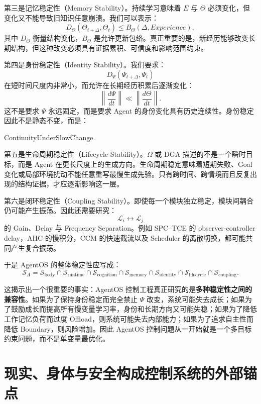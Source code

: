 第三是记忆稳定性（Memory Stability）。持续学习意味着 $E$ 与 $\Theta$ 必须变化，但变化又不能导致旧知识任意崩溃。我们可以表示：
\[
D_\Theta(
\Theta_{t+\Delta},
\Theta_t
)
\le
B_\Theta(\Delta,Experience),
\]
其中 $D_\Theta$ 衡量结构变化，$B_\Theta$ 是允许更新包络。真正重要的是，新经历能够改变长期结构，但这种改变必须具有证据累积、可信度和影响范围约束。

第四是身份稳定性（Identity Stability）。我们要求：
\[
D_\Psi(
\Psi_{t+\Delta},
\Psi_t
)
\]
在短时间尺度内非常小，而允许在长期经历积累后逐渐变化：
\[
\left\|
\frac{d\Psi}{dt}
\right\|
\ll
\left\|
\frac{d\Theta}{dt}
\right\|.
\]
这不是要求 $\Psi$ 永远固定，而是要求 Agent 的身份变化具有历史连续性。身份稳定因此不是静态不变，而是：
\begin{statementbox}
ContinuityUnderSlowChange.
\end{statementbox}

第五是生命周期稳定性（Lifecycle Stability）。$\Omega$ 或 DGA 描述的不是一个瞬时目标，而是 Agent 在更长尺度上的生成方向。生命周期稳定意味着短期失败、Goal 变化或局部环境扰动不能任意重写最慢生成先验。只有跨时间、跨情境而且反复出现的结构证据，才应逐渐影响这一层。

第六是闭环稳定性（Coupling Stability）。即使每一个模块独立稳定，模块间耦合仍可能产生振荡。因此还需要研究：
\[
\mathcal L_i
\leftrightarrow
\mathcal L_j
\]
的 Gain、Delay 与 Frequency Separation。例如 SPC--TCE 的 observer-controller delay，AHC 的慢积分，CCM 的快速截流以及 Scheduler 的离散切换，都可能共同产生复合振荡。

于是 AgentOS 的整体稳定性应写成：
\[
\boxed{
\mathcal S_A
=
\mathcal S_{\mathrm{body}}
\cap
\mathcal S_{\mathrm{runtime}}
\cap
\mathcal S_{\mathrm{cognition}}
\cap
\mathcal S_{\mathrm{memory}}
\cap
\mathcal S_{\mathrm{identity}}
\cap
\mathcal S_{\mathrm{lifecycle}}
\cap
\mathcal S_{\mathrm{coupling}}.
}
\]

这揭示出一个很重要的事实：AgentOS 控制工程真正研究的是\textbf{多种稳定性之间的兼容性}。如果为了保持身份稳定而完全禁止 $\Psi$ 改变，系统可能失去成长；如果为了鼓励成长而提高所有慢变量学习率，身份和长期方向又可能失稳；如果为了降低工作记忆负荷而过度 Offload，则系统可能失去内部能力；如果为了追求自主性而降低 Boundary，则风险增加。因此 AgentOS 控制问题从一开始就是一个多目标约束问题，而不是单变量最优化。

\section{现实、身体与安全构成控制系统的外部锚点}

